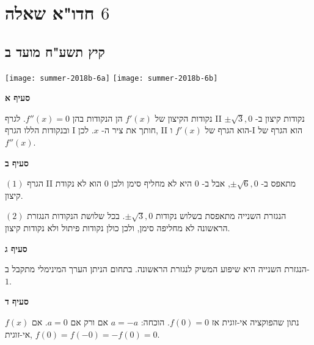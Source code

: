 

\chapter{חדו"א שאלה 
$6$}


\section{קיץ תשע"ח מועד ב}

\begin{center}
\texttt{[image: summer-2018b-6a]}
\texttt{[image: summer-2018b-6b]}
\end{center}

\vspace{-4ex}

\textbf{סעיף א}

נקודות הקיצון של
$f'(x)$
הן הנקודות בהן 
$f''(x)=0$.
לגרף II נקודות קיצון ב-%
$\pm\sqrt{3},0$
ובנקודות הללו הגרף I חותך את ציר ה-%
$x$.
לכן, II הוא הגרף של
$f'(x)$
ו-I הוא הגרף של
$f''(x)$.

\textbf{סעיף ב}

$(1)$
הגרף II מתאפס ב-%
$\pm\sqrt{6},0$,
אבל ב-%
$0$
היא לא מחליף סימן ולכן
$0$
הוא לא נקודת קיצון.

$(2)$
הנגזרת השנייה מתאפסת בשלוש נקודות
$\pm\sqrt{3},0$.
בכל שלושת הנקודות הנגזרת הראשונה לא מחליפה סימן, ולכן כולן נקודות פיתול ולא נקודות קיצון.

\np

\textbf{סעיף ג}

הנגזרת השנייה היא שיפוע המשיק לנגזרת הראשונה. בתחום הניתן הערך המינימלי מתקבל ב-%
$1$.


\textbf{סעיף ד}

נתון שהפוקציה אי-זוגית אז 
$f(0)=0$.
הוכחה:
$a=-a$
אם ורק אם
$a=0$.
אם
$f(x)$
אי-זוגית,
$f(0)=f(-0)=-f(0)=0$.


